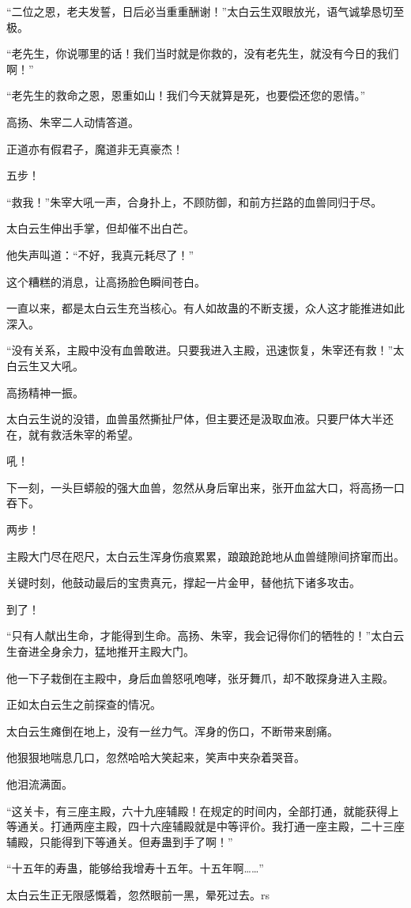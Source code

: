 \begin{this_body}
“二位之恩，老夫发誓，日后必当重重酬谢！”太白云生双眼放光，语气诚挚恳切至极。

“老先生，你说哪里的话！我们当时就是你救的，没有老先生，就没有今日的我们啊！”

“老先生的救命之恩，恩重如山！我们今天就算是死，也要偿还您的恩情。”

高扬、朱宰二人动情答道。

正道亦有假君子，魔道非无真豪杰！

五步！

“救我！”朱宰大吼一声，合身扑上，不顾防御，和前方拦路的血兽同归于尽。

太白云生伸出手掌，但却催不出白芒。

他失声叫道：“不好，我真元耗尽了！”

这个糟糕的消息，让高扬脸色瞬间苍白。

一直以来，都是太白云生充当核心。有人如故蛊的不断支援，众人这才能推进如此深入。

“没有关系，主殿中没有血兽敢进。只要我进入主殿，迅速恢复，朱宰还有救！”太白云生又大吼。

高扬精神一振。

太白云生说的没错，血兽虽然撕扯尸体，但主要还是汲取血液。只要尸体大半还在，就有救活朱宰的希望。

吼！

下一刻，一头巨蟒般的强大血兽，忽然从身后窜出来，张开血盆大口，将高扬一口吞下。

两步！

主殿大门尽在咫尺，太白云生浑身伤痕累累，踉踉跄跄地从血兽缝隙间挤窜而出。

关键时刻，他鼓动最后的宝贵真元，撑起一片金甲，替他抗下诸多攻击。

到了！

“只有人献出生命，才能得到生命。高扬、朱宰，我会记得你们的牺牲的！”太白云生奋进全身余力，猛地推开主殿大门。

他一下子栽倒在主殿中，身后血兽怒吼咆哮，张牙舞爪，却不敢探身进入主殿。

正如太白云生之前探查的情况。

太白云生瘫倒在地上，没有一丝力气。浑身的伤口，不断带来剧痛。

他狠狠地喘息几口，忽然哈哈大笑起来，笑声中夹杂着哭音。

他泪流满面。

“这关卡，有三座主殿，六十九座辅殿！在规定的时间内，全部打通，就能获得上等通关。打通两座主殿，四十六座辅殿就是中等评价。我打通一座主殿，二十三座辅殿，只能得到下等通关。但寿蛊到手了啊！”

“十五年的寿蛊，能够给我增寿十五年。十五年啊……”

太白云生正无限感慨着，忽然眼前一黑，晕死过去。rs

\end{this_body}

